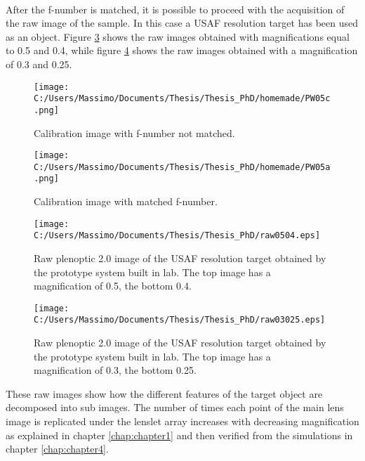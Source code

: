 \\
After the f-number is matched, it is possible to proceed with the acquisition of the raw image of the sample. In this case a USAF resolution target has been used as an object. Figure \ref{fig:rawreal} shows the raw images obtained with magnifications equal to 0.5 and 0.4, while figure \ref{fig:rawreal2} shows the raw images obtained with a magnification of 0.3 and 0.25.
\begin{figure}[H]
	\centering
	\texttt{[image: C:/Users/Massimo/Documents/Thesis/Thesis\_PhD/homemade/PW05c.png]}
	\caption{\label{fig:calibrationimg1} Calibration image with f-number not matched. }
\end{figure}
\begin{figure}[H]
	\centering
	\texttt{[image: C:/Users/Massimo/Documents/Thesis/Thesis\_PhD/homemade/PW05a.png]}
	\caption{\label{fig:calibrationimg2} Calibration image with matched f-number. }
\end{figure}
\begin{figure}[H]
	\centering
	\texttt{[image: C:/Users/Massimo/Documents/Thesis/Thesis\_PhD/raw0504.eps]}
	\caption{\label{fig:rawreal} Raw plenoptic 2.0 image of the USAF resolution target obtained by the prototype system built in lab. The top image has a magnification of 0.5, the bottom 0.4. }
\end{figure}
\begin{figure}[H]
	\centering
	\texttt{[image: C:/Users/Massimo/Documents/Thesis/Thesis\_PhD/raw03025.eps]}
	\caption{\label{fig:rawreal2} Raw plenoptic 2.0 image of the USAF resolution target obtained by the prototype system built in lab. The top image has a magnification of 0.3, the bottom 0.25. }
\end{figure}
These raw images show how the different features of the target object are decomposed into sub images. The number of times each point of the main lens image is replicated under the lenslet array increases with decreasing magnification as explained in chapter \ref{chap:chapter1} and then verified from the simulations in chapter \ref{chap:chapter4}.
\newpage 
